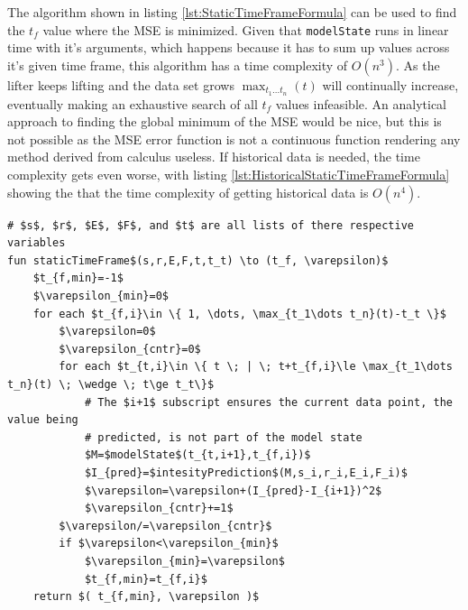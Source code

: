 The algorithm shown in listing \ref{lst:StaticTimeFrameFormula} can be used to find the $t_f$ value where the MSE is minimized. Given that \texttt{modelState} runs in linear time with it's arguments, which happens because it has to sum up values across it's given time frame, this algorithm has a time complexity of $O(n^3)$. As the lifter keeps lifting and the data set grows $\max_{t_1\dots t_n}(t)$ will continually increase, eventually making an exhaustive search of all $t_f$ values infeasible. An analytical approach to finding the global minimum of the MSE would be nice, but this is not possible as the MSE error function is not a continuous function rendering any method derived from calculus useless. If historical data is needed, the time complexity gets even worse, with listing \ref{lst:HistoricalStaticTimeFrameFormula} showing the that the time complexity of getting historical data is $O(n^4)$.


\begin{minipage}{\linewidth}
\begin{lstlisting}[caption={The algorithm that describes how to exhaustively find a static time frame's length such that it minimizes the models error.},label={lst:StaticTimeFrameFormula},mathescape=true]
# $s$, $r$, $E$, $F$, and $t$ are all lists of there respective variables
fun staticTimeFrame$(s,r,E,F,t,t_t) \to (t_f, \varepsilon)$
    $t_{f,min}=-1$
    $\varepsilon_{min}=0$
    for each $t_{f,i}\in \{ 1, \dots, \max_{t_1\dots t_n}(t)-t_t \}$
        $\varepsilon=0$
        $\varepsilon_{cntr}=0$
        for each $t_{t,i}\in \{ t \; | \; t+t_{f,i}\le \max_{t_1\dots t_n}(t) \; \wedge \; t\ge t_t\}$
            # The $i+1$ subscript ensures the current data point, the value being
            # predicted, is not part of the model state
            $M=$modelState$(t_{t,i+1},t_{f,i})$
            $I_{pred}=$intesityPrediction$(M,s_i,r_i,E_i,F_i)$
            $\varepsilon=\varepsilon+(I_{pred}-I_{i+1})^2$
            $\varepsilon_{cntr}+=1$
        $\varepsilon/=\varepsilon_{cntr}$
        if $\varepsilon<\varepsilon_{min}$
            $\varepsilon_{min}=\varepsilon$
            $t_{f,min}=t_{f,i}$
    return $( t_{f,min}, \varepsilon )$
\end{lstlisting}
\end{minipage}

